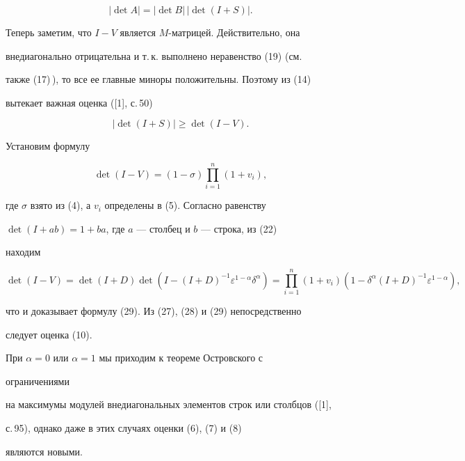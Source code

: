 \begin{pf}
\begin{equation}
|\det A|=|\det B|\,|\det (I+S)|. 


\end{equation} 


Теперь заметим, что $I-V$ является $M$-матрицей. Действительно, она 


внедиагонально отрицательна и т.\,к. выполнено неравенство (19) (см. 


также (17)\,), то все ее главные миноры положительны. Поэтому из (14) 


вытекает важная оценка ([1], с.\,50) 


\begin{equation} 


|\det(I+S)|\ge\det(I-V). 


\end{equation} 


Установим формулу 


\begin{equation} 


\det(I-V)=(1-\sigma)\prod^n_{i=1}(1+v_i), 


\end{equation} 


где $\sigma$ взято из (4), а $v_i$ определены в (5). Согласно равенству 


$\det(I+ab)=1+ba$, где $a$ --- столбец и $b$ --- строка, из (22) 


находим 


$$ 


\det(I-V)=\det(I+D)\det(I-(I+D)^{-1}\varepsilon^{1-\alpha} 


\delta^\alpha)=\prod^n_{i=1}(1+v_i)(1-\delta^\alpha 


(I+D)^{-1}\varepsilon^{1-\alpha}), 


$$ 


что и доказывает формулу (29). Из (27), (28) и (29) непосредственно 


следует оценка (10). 


\end{pf} 


 


\begin{notenonum} 


При $\alpha=0$ или $\alpha=1$ мы приходим к теореме Островского с 


ограничениями  


на максимумы модулей внедиагональных элементов строк или столбцов ([1], 


с.\,95), однако даже в этих случаях оценки (6), (7) и (8) 


являются новыми. 


\end{notenonum} 


